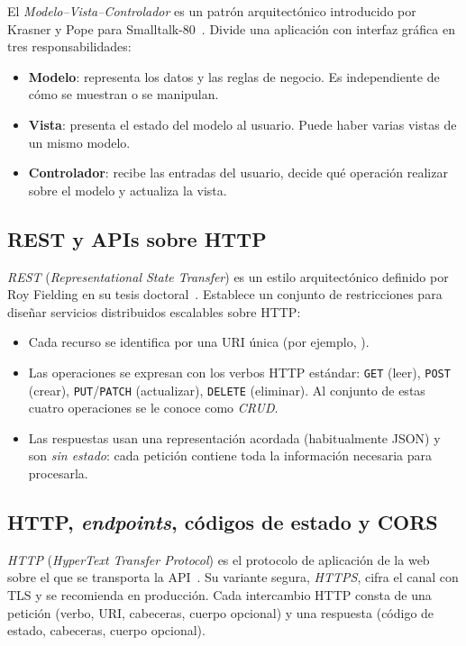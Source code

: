 El \emph{Modelo--Vista--Controlador} es un patrón arquitectónico introducido por Krasner y Pope para Smalltalk-80~\cite{krasner1988}. Divide una aplicación con interfaz gráfica en tres responsabilidades:

\begin{itemize}
    \item \textbf{Modelo}: representa los datos y las reglas de negocio. Es independiente de cómo se muestran o se manipulan.
    \item \textbf{Vista}: presenta el estado del modelo al usuario. Puede haber varias vistas de un mismo modelo.
    \item \textbf{Controlador}: recibe las entradas del usuario, decide qué operación realizar sobre el modelo y actualiza la vista.
\end{itemize}

\subsection{REST y APIs sobre HTTP}

\emph{REST} (\emph{Representational State Transfer}) es un estilo arquitectónico definido por Roy Fielding en su tesis doctoral~\cite{fielding2000}. Establece un conjunto de restricciones para diseñar servicios distribuidos escalables sobre HTTP:

\begin{itemize}
    \item Cada recurso se identifica por una URI única (por ejemplo, ).
    \item Las operaciones se expresan con los verbos HTTP estándar: \texttt{GET} (leer), \texttt{POST} (crear), \texttt{PUT}/\texttt{PATCH} (actualizar), \texttt{DELETE} (eliminar). Al conjunto de estas cuatro operaciones se le conoce como \emph{CRUD}.
    \item Las respuestas usan una representación acordada (habitualmente JSON) y son \emph{sin estado}: cada petición contiene toda la información necesaria para procesarla.
\end{itemize}

\subsection{HTTP, \emph{endpoints}, códigos de estado y CORS}\label{subsec:http-cors}

\emph{HTTP} (\emph{HyperText Transfer Protocol}) es el protocolo de aplicación de la web sobre el que se transporta la API~\cite{rfc9110}. Su variante segura, \emph{HTTPS}, cifra el canal con TLS y se recomienda en producción. Cada intercambio HTTP consta de una petición (verbo, URI, cabeceras, cuerpo opcional) y una respuesta (código de estado, cabeceras, cuerpo opcional).

